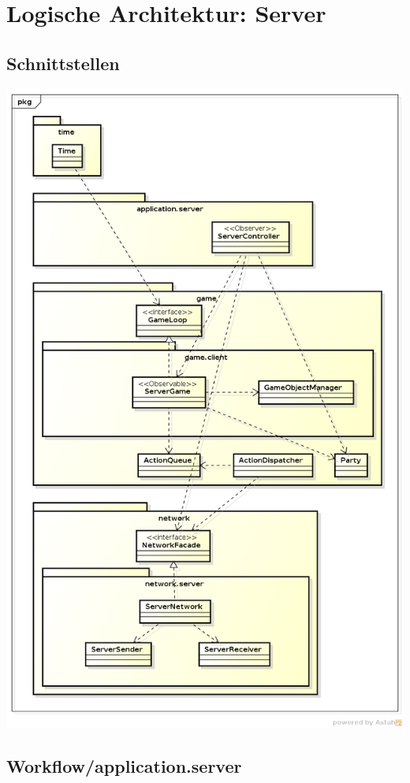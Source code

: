 \documentclass[11pt]{scrartcl}
\begin{document}
\section{Logische Architektur: Server}
\subsection{Schnittstellen}
\includegraphics[scale=0.48]{LogischeSichtServer}


\subsection{Workflow/application.server}
\end{document}
